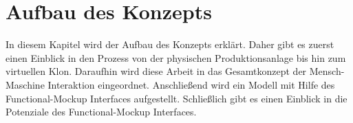 \chapter{Aufbau des Konzepts}\label{cha:AufbauDesKonzepts}
In diesem Kapitel wird der Aufbau des Konzepts erklärt. Daher gibt es zuerst einen Einblick in den Prozess von der physischen Produktionsanlage bis hin zum virtuellen Klon. Daraufhin wird diese Arbeit in das Gesamtkonzept der Mensch-Maschine Interaktion eingeordnet. Anschließend wird ein Modell mit Hilfe des Functional-Mockup Interfaces aufgestellt. Schließlich gibt es einen Einblick in die Potenziale des Functional-Mockup Interfaces.

